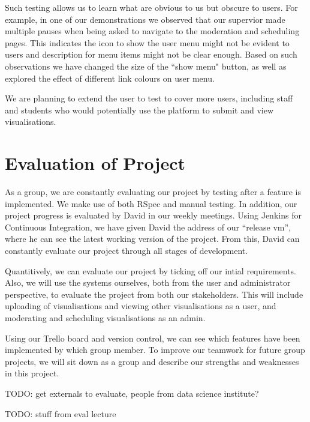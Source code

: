\documentclass[a4paper]{article}
\begin{document}
Such testing allows us to learn what are obvious to us but obscure to users.
For example, in one of our demonstrations we observed that our supervior 
made multiple pauses when
being asked to navigate to the moderation and scheduling pages. This 
indicates the icon to show the user menu might not be evident to users and
description for menu items might not be clear enough. Based on such observations
we have changed the size of the ``show menu" button, as well as explored the effect
of different link colours on user menu.

We are planning to extend the user to test to cover more users, including staff
and students who would potentially use the platform to submit and view visualisations.

\section{Evaluation of Project}
As a group, we are constantly evaluating our project by testing after a 
feature is implemented. We make use of both RSpec and manual testing. In 
addition, our project progress is evaluated by David in our weekly 
meetings. Using Jenkins for Continuous Integration, we have given David
the address of our ``release vm'', where he can see the latest working 
version of the project. From this, David can constantly evaluate our project 
through all stages of development.

Quantitively, we can evaluate our project by ticking off our intial 
requirements. Also, we will use the systems ourselves, both from the user 
and administrator perspective, to evaluate the project from both our stakeholders.
This will include uploading of visualisations and viewing other visualisations as a
user, and moderating and scheduling visualisations as an admin.

Using our Trello board and version control, we can see which features have been 
implemented by which group member. To improve our teamwork for future group 
projects, we will sit down as a group and describe our strengths and weaknesses in 
this project.

TODO: get externals to evaluate, people from data science institute? 

TODO: stuff from eval lecture
\end{document}
